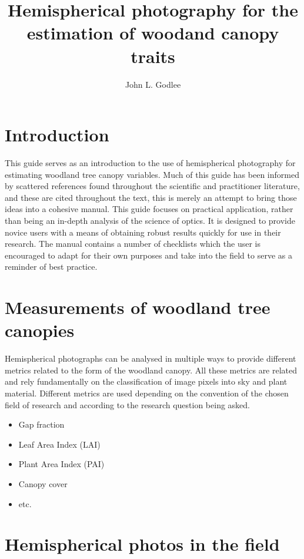 \documentclass{article}
\title{Hemispherical photography for the estimation of woodand canopy traits}
\date{}
\author{John L. Godlee}
\begin{document}
\maketitle{}
\tableofcontents{}
\newpage{}

\section{Introduction}

This guide serves as an introduction to the use of hemispherical photography for estimating woodland tree canopy variables. Much of this guide has been informed by scattered references found throughout the scientific and practitioner literature, and these are cited throughout the text, this is merely an attempt to bring those ideas into a cohesive manual. This guide focuses on practical application, rather than being an in-depth analysis of the science of optics. It is designed to provide novice users with a means of obtaining robust results quickly for use in their research. The manual contains a number of checklists which the user is encouraged to adapt for their own purposes and take into the field to serve as a reminder of best practice.

\section{Measurements of woodland tree canopies}

Hemispherical photographs can be analysed in multiple ways to provide different metrics related to the form of the woodland canopy. All these metrics are related and rely fundamentally on the classification of image pixels into sky and plant material. Different metrics are used depending on the convention of the chosen field of research and according to the research question being asked. 

\begin{itemize}
	\item{Gap fraction}
	\item{Leaf Area Index (LAI)}
	\item{Plant Area Index (PAI)}
	\item{Canopy cover}
	\item{etc.}
\end{itemize}

\section{Hemispherical photos in the field}
\end{document}
